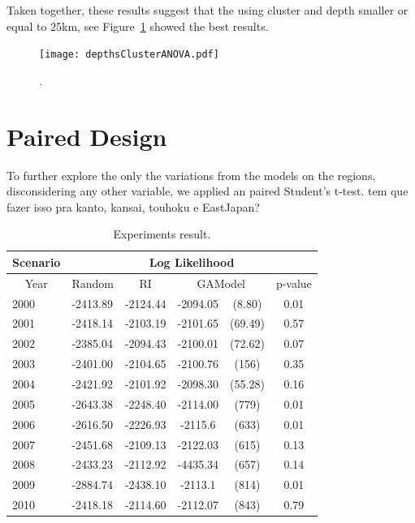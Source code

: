 Taken together, these results suggest that the using cluster and depth smaller or equal to 25km, see Figure~\ref{depthsClusterANOVA} showed the best results.\\

\begin{figure}[H]
	\centering
	\texttt{[image: depthsClusterANOVA.pdf]}
	\caption{.}
	\label{depthsClusterANOVA}
\end{figure}

\section{Paired Design}

To further explore the only the variations from the models on the regions, disconsidering any other variable, we applied an paired Student’s t-test. 
 tem que fazer isso pra kanto, kansai, touhoku e EastJapan?
\begin{table}[!ht]
	\begin{center}
		\begin{tabular}{|l|l|c|cc|c|}
			\hline
			\multicolumn{1}{|c|}{Scenario} & \multicolumn{5}{|c|}{Log Likelihood} \\
			\hline
			\multicolumn{1}{|c|}{Year} & \multicolumn{1}{|c|}{Random} & \multicolumn{1}{|c|}{RI} & \multicolumn{2}{c}{GAModel} & \multicolumn{1}{|c|}{p-value} \\    
			\hline
			2000 &-2413.89 &-2124.44 &\raggedright  -2094.05 &\raggedleft (8.80) & 0.01\\%
			2001 &-2418.14 &-2103.19 &\raggedright  -2101.65 &\raggedleft  (69.49) & 0.57\\%
			2002 &-2385.04 &-2094.43 &\raggedright  -2100.01 &\raggedleft (72.62) & 0.07\\%
			2003 &-2401.00 &-2104.65 &\raggedright  -2100.76 &\raggedleft (156) & 0.35\\%
			2004 &-2421.92 &-2101.92 &\raggedright  -2098.30 &\raggedleft (55.28) & 0.16\\%
			2005 &-2643.38 &-2248.40 &\raggedright  -2114.00 &\raggedleft (779) & 0.01\\%
			2006 &-2616.50 &-2226.93 &\raggedright  -2115.6 &\raggedleft (633) & 0.01\\%
			2007 &-2451.68 &-2109.13 &\raggedright  -2122.03 &\raggedleft (615) &  0.13\\%
			2008 &-2433.23 &-2112.92 &\raggedright  -4435.34 &\raggedleft (657) & 0.14\\%
			2009 &-2884.74 &-2438.10 &\raggedright  -2113.1 &\raggedleft (814) & 0.01\\%
			2010 &-2418.18 &-2114.60 &\raggedright -2112.07 &\raggedleft (843) & 0.79\\%
			\hline
		\end{tabular}
	\end{center}
	\caption{Experiments result.}
	\label{gaxriTable}
\end{table}

